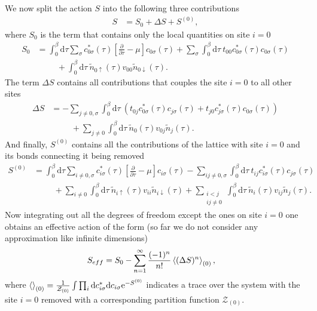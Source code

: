 \documentclass[12pt,a4paper]{scrartcl}
\numberwithin{equation}{section}
\begin{document}
We now split the action $S$ into the following three contributions
\begin{align}
 S &= S_0 + \Delta S + S^{(0)},
\end{align}
where $S_0$ is the term that contains only the local quantities on site $i=0$
\begin{align}
S_0
&= \int_0^{\beta} \mathrm{d}\tau \sum_{\sigma} c^*_{0\sigma}(\tau)\left[ \frac{\partial}{\partial \tau} - \mu \right] c_{0\sigma}(\tau) 
   + \sum_{\sigma} \int_0^{\beta} \mathrm{d}\tau \ t_{00} c^*_{0\sigma}(\tau)  c_{0\sigma}(\tau)  \nonumber \\ 
 &\hspace{1cm}+  \int_0^{\beta} \mathrm{d}\tau \ \tilde{n}_{0\uparrow}(\tau) v_{00} \tilde{n}_{0\downarrow}(\tau).
\end{align}
The term $\Delta S$ contains all contributions that couples the site $i=0$ to all other sites 
\begin{align}
\Delta S 
&=  -\sum_{j\neq 0,\sigma} \int_0^{\beta} \mathrm{d}\tau \ \left( t_{0j} c^*_{0\sigma}(\tau)  c_{j\sigma}(\tau) + t_{j0} c^*_{j\sigma}(\tau)  c_{0\sigma}(\tau) \right) \nonumber \\
&\hspace{1cm} + \sum_{j\neq 0 } \int_0^{\beta} \mathrm{d}\tau \ \tilde{n}_{0}(\tau) v_{0j} \tilde{n}_{j}(\tau).
\end{align}
And finally, $S^{(0)}$ contains all the contributions of the lattice with
site $i=0$ and its bonds connecting it being removed
\begin{align}
S^{(0)} 
&= \int_0^{\beta} \mathrm{d}\tau \sum_{i\neq 0,\sigma} c^*_{i\sigma}(\tau)\left[ \frac{\partial}{\partial \tau} - \mu \right] c_{i\sigma}(\tau) 
    -\sum_{ij\neq 0 ,\sigma} \int_0^{\beta} \mathrm{d}\tau \ t_{ij} c^*_{i\sigma}(\tau)  c_{j\sigma}(\tau)  \nonumber \\
&\hspace{1cm} + \sum_{i\neq 0 } \int_0^{\beta} \mathrm{d}\tau \ \tilde{n}_{i\uparrow}(\tau) v_{ii} \tilde{n}_{i\downarrow}(\tau)
+ \sum_{\substack{i<j \\ ij\neq 0  }} \int_0^{\beta} \mathrm{d}\tau \ \tilde{n}_{i}(\tau) v_{ij} \tilde{n}_{j}(\tau).
\end{align}
Now integrating out all the degrees of freedom except the ones on site $i=0$ one obtains 
an effective action of the form (so far we do not consider any approximation like infinite dimensions)
\begin{align}
 S_{eff} &= S_0
 - \sum_{n=1}^{\infty} \frac{(-1)^n}{n!} \braket{ (\Delta S)^n }_{(0)},
\end{align}
where $\braket{  }_{(0)} = \frac{1}{\mathcal{Z}_{(0)}} \int \prod_i \mathrm{d}c^*_{i\sigma} \mathrm{d}c_{i\sigma} \mathrm{e}^{-S^{(0)}}$ indicates a trace over the system with the site $i=0$ removed with a corresponding
partition function $\mathcal{Z}_{(0)}$.
\end{document}
